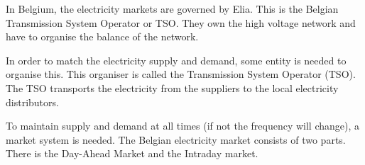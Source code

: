 In Belgium, the electricity markets are governed by Elia. This is the Belgian Transmission System Operator or TSO. They own the high voltage network and have to organise the balance of the network.

In order to match the electricity supply and demand, some entity is needed to organise this. This organiser is called the Transmission System Operator (TSO). The TSO transports the electricity from the suppliers to the local electricity distributors.

To maintain supply and demand at all times (if not the frequency will change), a market system is needed. The Belgian electricity market consists of two parts. There is the Day-Ahead Market and the Intraday market.